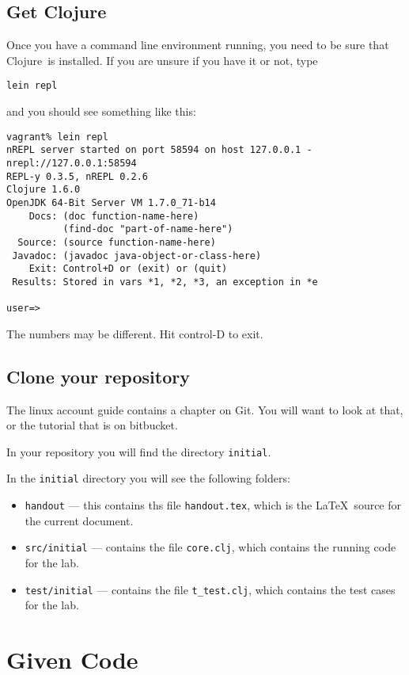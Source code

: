 \documentclass[12pt]{article}
\def\clojure{{\mysc Clojure}}
\begin{document}
\subsection{Get \clojure}

Once you have a command line environment running, you need to be sure that
\clojure~is installed.  If you are unsure if you have it or not, type

\texttt{lein repl}

and you should see something like this:

\begin{verbatim}
vagrant% lein repl
nREPL server started on port 58594 on host 127.0.0.1 - nrepl://127.0.0.1:58594
REPL-y 0.3.5, nREPL 0.2.6
Clojure 1.6.0
OpenJDK 64-Bit Server VM 1.7.0_71-b14
    Docs: (doc function-name-here)
          (find-doc "part-of-name-here")
  Source: (source function-name-here)
 Javadoc: (javadoc java-object-or-class-here)
    Exit: Control+D or (exit) or (quit)
 Results: Stored in vars *1, *2, *3, an exception in *e

user=> 
\end{verbatim}

The numbers may be different.  Hit control-D to exit.

\subsection{Clone your repository}

The linux account guide contains a chapter on Git.  You will want to look at that, or
the tutorial that is on bitbucket.

In your repository you will find the directory \texttt{initial}.

In the \texttt{initial} directory you will see the following folders:

\begin{itemize}
\item \texttt{handout} --- this contains ths file \texttt{handout.tex}, which is the \LaTeX\ source
  for the current document.
\item \texttt{src/initial} --- contains the file \texttt{core.clj}, which contains the
  running code for the lab.
\item \texttt{test/initial} --- contains the file \texttt{t\_test.clj}, which
  contains the test cases for the lab.
\end{itemize}

\section{Given Code}
\end{document}
